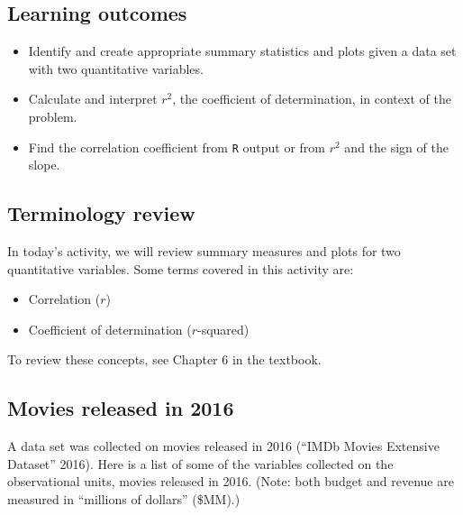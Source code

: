 \documentclass[
]{report}
\begin{document}

\hypertarget{learning-outcomes-7}{%
\subsection{Learning outcomes}\label{learning-outcomes-7}}

\begin{itemize}
\item
  Identify and create appropriate summary statistics and plots
  given a data set with two quantitative variables.
\item
  Calculate and interpret \(r^2\), the coefficient of determination, in context of the problem.
\item
  Find the correlation coefficient from \texttt{R} output or from \(r^2\) and the sign of the slope.
\end{itemize}

\hypertarget{terminology-review-7}{%
\subsection{Terminology review}\label{terminology-review-7}}

In today's activity, we will review summary measures and plots for two quantitative variables. Some terms covered in this activity are:

\begin{itemize}
\item
  Correlation (\(r\))
\item
  Coefficient of determination (\(r\)-squared)
\end{itemize}

To review these concepts, see Chapter 6 in the textbook.

\hypertarget{movies-released-in-2016-1}{%
\subsection{Movies released in 2016}\label{movies-released-in-2016-1}}

A data set was collected on movies released in 2016 ({``{IMDb} Movies Extensive Dataset''} 2016). Here is a list of some of the variables collected on the observational units, movies released in 2016. (Note: both budget and revenue are measured in ``millions of dollars'' (\$MM).)
\end{document}
